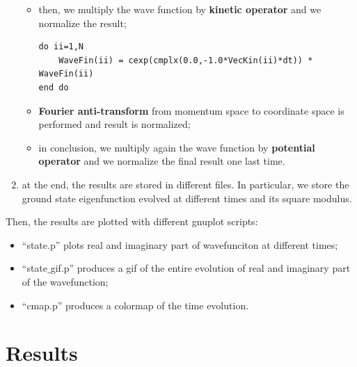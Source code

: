 \documentclass[rmp,10pt,onecolumn,fleqn,notitlepage]{revtex4-1}
\begin{document}
\begin{enumerate}
\begin{itemize}
\item then, we multiply the wave function by \textbf{kinetic operator} and we normalize the result;

\begin{minipage}[t]{0.75\linewidth}%
\begin{lstlisting}[style=Fortran]
do ii=1,N
    WaveFin(ii) = cexp(cmplx(0.0,-1.0*VecKin(ii)*dt)) * WaveFin(ii)
end do\end{lstlisting}
\end{minipage}

\item \textbf{Fourier anti-transform} from momentum space to coordinate space is performed and result is normalized;

\item in conclusion, we multiply again the wave function by \textbf{potential operator} and we normalize the final result one last time.

\end{itemize}

\item at the end, the results are stored in different files. In particular, we store the ground state eigenfunction evolved at different times and its square modulus.

\end{enumerate}

Then, the results are plotted with different gnuplot scripts:

\begin{itemize}
\item “state.p” plots real and imaginary part of wavefunciton at different times;
\item “state$\_$gif.p” produces a gif of the entire evolution of real and imaginary part of the wavefunction;
\item “cmap.p” produces a colormap of the time evolution.
\end{itemize}






\section{Results}
\end{document}
